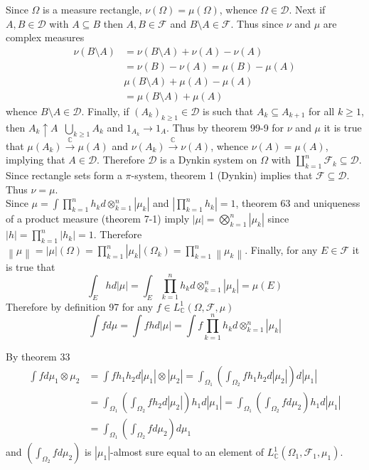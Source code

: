 \documentclass[a4paper]{article}
\newcommand{\brac}[1]{\left ( #1 \right )}
\newcommand{\abs}[1]{\left | #1 \right |}
\newcommand{\nrm}[1]{\left\| #1 \right \|}
\newcommand{\Cplx}{\mathbb{C}}
\newcommand{\Dcal}{\mathcal{D}}
\newcommand{\Fcal}{\mathcal{F}}
\newcommand{\defn}{\mathop{\overset{\Delta}{=}}\nolimits}
\begin{document}
Since $\Omega$ is a measure rectangle, $\nu\brac{\Omega}=\mu\brac{\Omega}$, whence $\Omega\in \Dcal$. Next if $A,B\in \Dcal$ with $A\subseteq B$ then $A,B\in \Fcal$ and $B\setminus A\in \Fcal$. Thus since $\nu$ and $\mu$ are complex measures \begin{align*}\nu\brac{B\setminus A} &= \nu\brac{B\setminus A} + \nu\brac{A} - \nu\brac{A}\\&= \nu\brac{B} - \nu\brac{A} = \mu\brac{B} - \mu\brac{A}\\& \mu\brac{B\setminus A} + \mu\brac{A} - \mu\brac{A}\\ &= \mu\brac{B\setminus A} + \mu\brac{A}\end{align*} whence $B\setminus A\in \Dcal$. Finally, if $\brac{A_k}_{k\geq1}\in\Dcal$ is such that $A_k\subseteq A_{k+1}$ for all $k\geq1$, then $A_k\uparrow A\defn \bigcup_{k\geq1}A_k$ and $1_{A_k}\to 1_A$. Thus by theorem 99-9 for $\nu$ and $\mu$ it is true that $\mu\brac{A_k}\overset{\Cplx}{\to}\mu\brac{A}$ and $\nu\brac{A_k}\overset{\Cplx}{\to}\nu\brac{A}$, whence $\nu\brac{A}=\mu\brac{A}$, implying that $A\in\Dcal$. Therefore $\Dcal$ is a Dynkin system on $\Omega$ with $\coprod_{k=1}^n \Fcal_k \subseteq \Dcal$. Since rectangle sets form a $\pi$-system, theorem 1 (Dynkin) implies that $\Fcal\subseteq \Dcal$. Thus $\nu = \mu$.\\

Since $\mu=\int \prod_{k=1}^n h_k d\otimes_{k=1}^n\abs{\mu_k}$ and $\abs{\prod_{k=1}^n h_k}=1$, theorem 63 and uniqueness of a product measure (theorem 7-1) imply $\abs{\mu} = \bigotimes_{k=1}^n\abs{\mu_k}$ since $\abs{h} = \prod_{k=1}^n \abs{h_k} = 1$. Therefore $\nrm{\mu} = \abs{\mu}\brac{\Omega} = \prod_{k=1}^n \abs{\mu_k}\brac{\Omega_k} = \prod_{k=1}^n \nrm{\mu_k}$. Finally, for any $E\in \Fcal$ it is true that \[\int_E h d\abs{\mu} = \int_E \prod_{k=1}^n h_k d\otimes_{k=1}^n \abs{\mu_k} = \mu\brac{E}\] Therefore by definition 97 for any $f\in L^1_\Cplx\brac{\Omega, \Fcal, \mu}$ \[\int f d\mu = \int f h d\abs{\mu} = \int f \prod_{k=1}^n h_k d\otimes_{k=1}^n \abs{\mu_k}\]

By theorem 33 \begin{align*}\int f d\mu_1\otimes\mu_2 &= \int f h_1 h_2 d\abs{\mu_1}\otimes\abs{\mu_2} = \int_{\Omega_1} \brac{\int_{\Omega_2} f h_1 h_2 d\abs{\mu_2}} d\abs{\mu_1}\\ &= \int_{\Omega_1} \brac{\int_{\Omega_2} f h_2 d\abs{\mu_2}} h_1 d\abs{\mu_1} = \int_{\Omega_1} \brac{\int_{\Omega_2} f d\mu_2} h_1 d\abs{\mu_1}\\ &= \int_{\Omega_1} \brac{\int_{\Omega_2} f d\mu_2} d\mu_1\end{align*} and $\brac{\int_{\Omega_2} f d\mu_2}$ is $\abs{\mu_1}$-almost sure equal to an element of $L^1_\Cplx\brac{\Omega_1,\Fcal_1,\mu_1}$.
\end{document}

